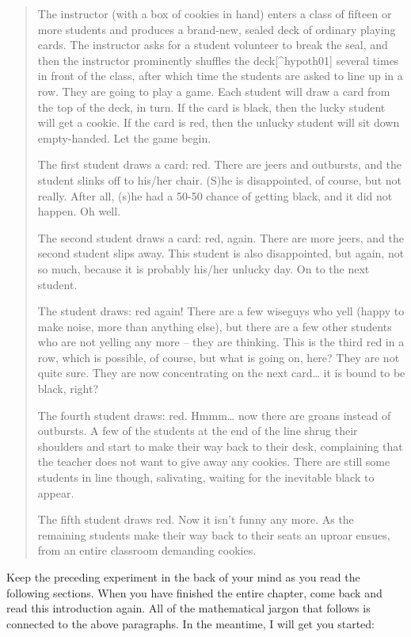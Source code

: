 \documentclass[]{book}
\numberwithin{equation}{chapter}
\numberwithin{figure}{chapter}
\theoremstyle{plain}
\theoremstyle{definition}
\theoremstyle{remark}
\theoremstyle{definition}
\theoremstyle{definition}
\theoremstyle{remark}
\begin{document}
\begin{quote}
The instructor (with a box of cookies in hand) enters a class of fifteen
or more students and produces a brand-new, sealed deck of ordinary
playing cards. The instructor asks for a student volunteer to break the
seal, and then the instructor prominently shuffles the
deck{[}\^{}hypoth01{]} several times in front of the class, after which
time the students are asked to line up in a row. They are going to play
a game. Each student will draw a card from the top of the deck, in turn.
If the card is black, then the lucky student will get a cookie. If the
card is red, then the unlucky student will sit down empty-handed. Let
the game begin.

The first student draws a card: red. There are jeers and outbursts, and
the student slinks off to his/her chair. (S)he is disappointed, of
course, but not really. After all, (s)he had a 50-50 chance of getting
black, and it did not happen. Oh well.

The second student draws a card: red, again. There are more jeers, and
the second student slips away. This student is also disappointed, but
again, not so much, because it is probably his/her unlucky day. On to
the next student.

The student draws: red again! There are a few wiseguys who yell (happy
to make noise, more than anything else), but there are a few other
students who are not yelling any more -- they are thinking. This is the
third red in a row, which is possible, of course, but what is going on,
here? They are not quite sure. They are now concentrating on the next
card\ldots{} it is bound to be black, right?

The fourth student draws: red. Hmmm\ldots{} now there are groans instead
of outbursts. A few of the students at the end of the line shrug their
shoulders and start to make their way back to their desk, complaining
that the teacher does not want to give away any cookies. There are still
some students in line though, salivating, waiting for the inevitable
black to appear.

The fifth student draws red. Now it isn't funny any more. As the
remaining students make their way back to their seats an uproar ensues,
from an entire classroom demanding cookies.
\end{quote}

Keep the preceding experiment in the back of your mind as you read the
following sections. When you have finished the entire chapter, come back
and read this introduction again. All of the mathematical jargon that
follows is connected to the above paragraphs. In the meantime, I will
get you started:
\end{document}
